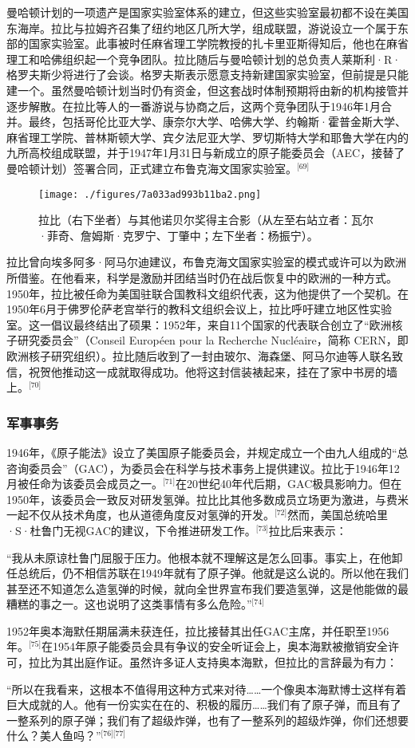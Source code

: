曼哈顿计划的一项遗产是国家实验室体系的建立，但这些实验室最初都不设在美国东海岸。拉比与拉姆齐召集了纽约地区几所大学，组成联盟，游说设立一个属于东部的国家实验室。此事被时任麻省理工学院教授的扎卡里亚斯得知后，他也在麻省理工和哈佛组织起一个竞争团队。拉比随后与曼哈顿计划的总负责人莱斯利·R·格罗夫斯少将进行了会谈。格罗夫斯表示愿意支持新建国家实验室，但前提是只能建一个。虽然曼哈顿计划当时仍有资金，但这套战时体制预期将由新的机构接管并逐步解散。在拉比等人的一番游说与协商之后，这两个竞争团队于1946年1月合并。最终，包括哥伦比亚大学、康奈尔大学、哈佛大学、约翰斯·霍普金斯大学、麻省理工学院、普林斯顿大学、宾夕法尼亚大学、罗切斯特大学和耶鲁大学在内的九所高校组成联盟，并于1947年1月31日与新成立的原子能委员会（AEC，接替了曼哈顿计划）签署合同，正式建立布鲁克海文国家实验室。\(^\text{[69]}\)
\begin{figure}[ht]
\centering
\texttt{[image: ./figures/7a033ad993b11ba2.png]}
\caption{拉比（右下坐者）与其他诺贝尔奖得主合影（从左至右站立者：瓦尔·菲奇、詹姆斯·克罗宁、丁肇中；左下坐者：杨振宁）。} \label{fig_YXDlb_4}
\end{figure}
拉比曾向埃多阿多·阿马尔迪建议，布鲁克海文国家实验室的模式或许可以为欧洲所借鉴。在他看来，科学是激励并团结当时仍在战后恢复中的欧洲的一种方式。1950年，拉比被任命为美国驻联合国教科文组织代表，这为他提供了一个契机。在1950年6月于佛罗伦萨老宫举行的教科文组织会议上，拉比呼吁建立地区性实验室。这一倡议最终结出了硕果：1952年，来自11个国家的代表联合创立了“欧洲核子研究委员会”（Conseil Européen pour la Recherche Nucléaire，简称 CERN，即欧洲核子研究组织）。拉比随后收到了一封由玻尔、海森堡、阿马尔迪等人联名致信，祝贺他推动这一成就取得成功。他将这封信装裱起来，挂在了家中书房的墙上。\(^\text{[70]}\)
\subsubsection{军事事务}
1946年，《原子能法》设立了美国原子能委员会，并规定成立一个由九人组成的“总咨询委员会”（GAC），为委员会在科学与技术事务上提供建议。拉比于1946年12月被任命为该委员会成员之一。\(^\text{[71]}\)在20世纪40年代后期，GAC极具影响力。但在1950年，该委员会一致反对研发氢弹。拉比比其他多数成员立场更为激进，与费米一起不仅从技术角度，也从道德角度反对氢弹的开发。\(^\text{[72]}\)然而，美国总统哈里·S·杜鲁门无视GAC的建议，下令推进研发工作。\(^\text{[73]}\)拉比后来表示：

“我从未原谅杜鲁门屈服于压力。他根本就不理解这是怎么回事。事实上，在他卸任总统后，仍不相信苏联在1949年就有了原子弹。他就是这么说的。所以他在我们甚至还不知道怎么造氢弹的时候，就向全世界宣布我们要造氢弹，这是他能做的最糟糕的事之一。这也说明了这类事情有多么危险。”\(^\text{[74]}\)

1952年奥本海默任期届满未获连任，拉比接替其出任GAC主席，并任职至1956年。\(^\text{[75]}\)在1954年原子能委员会具有争议的安全听证会上，奥本海默被撤销安全许可，拉比为其出庭作证。虽然许多证人支持奥本海默，但拉比的言辞最为有力：

“所以在我看来，这根本不值得用这种方式来对待……一个像奥本海默博士这样有着巨大成就的人。他有一份实实在在的、积极的履历……我们有了原子弹，而且有了一整系列的原子弹；我们有了超级炸弹，也有了一整系列的超级炸弹，你们还想要什么？美人鱼吗？”\(^\text{[76][77]}\)
